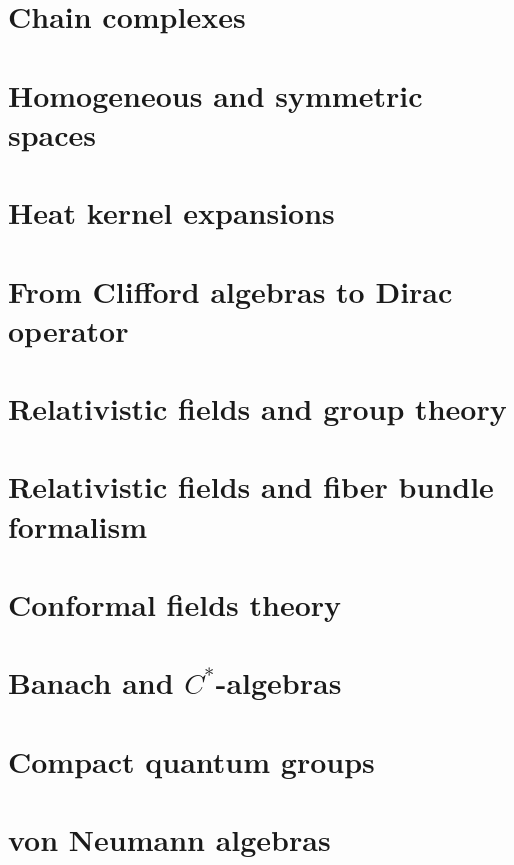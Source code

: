 \documentclass[a4paper,twoside,11pt]{book}
\begin{document}
\chapter{Chain complexes}


\chapter{Homogeneous and symmetric spaces}




\chapter{Heat kernel expansions}


\chapter{From Clifford algebras to Dirac operator}



\chapter{Relativistic fields and group theory}


\chapter{Relativistic fields and fiber bundle formalism}


\chapter{Conformal fields theory}


\chapter{Banach and \texorpdfstring{$C^*$}{C*}-algebras}




\chapter{Compact quantum groups}


\chapter{von Neumann algebras}




\end{document}
